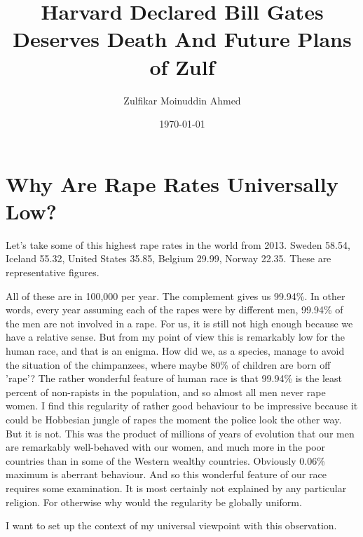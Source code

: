 \documentclass{amsart}
\title{Harvard Declared Bill Gates Deserves Death And Future Plans of Zulf}
\author{Zulfikar Moinuddin Ahmed}
\date{\today}
\begin{document}
\maketitle

\section{Why Are Rape Rates Universally Low?}

Let's take some of this highest rape rates in the world from 2013. Sweden 58.54, Iceland 55.32,  United States 35.85, Belgium 29.99, Norway 22.35.  These are representative figures.

All of these are in 100,000 per year.   The complement gives us 99.94\%.  In other words, every year assuming each of the rapes were by different men, 99.94\% of the men are not involved in a rape.  For us, it is still not high enough because we have a relative sense.  But from my point of view this is remarkably low for the human race, and that is an enigma.  How did we, as a species, manage to avoid the situation of the chimpanzees, where maybe 80\% of children are born off 'rape'?  The rather wonderful feature of human race is that 99.94\% is the least percent of non-rapists in the population, and so almost all men never rape women.  I find this regularity of rather good behaviour to be impressive because it could be Hobbesian jungle of rapes the moment the police look the other way.  But it is not.  This was the product of millions of years of evolution that our men are remarkably well-behaved with our women, and much more in the poor countries than in some of the Western wealthy countries.  Obviously 0.06\% maximum is aberrant behaviour.  And so this wonderful feature of our race requires some examination.  It is most certainly not explained by any particular religion.  For otherwise why would the regularity be globally uniform.

I want to set up the context of my universal viewpoint with this observation. 
\end{document}
